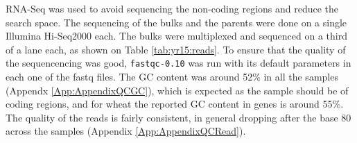 RNA-Seq was used to avoid sequencing the non-coding regions and reduce the search space.  
The sequencing of the bulks and the parents were done on a single Illumina Hi-Seq2000 each.
The bulks were multiplexed and sequenced on a third of a lane each, as shown on Table \ref{tab:yr15:reads}. 
To ensure that the quality of the sequencencing was good, \verb|fastqc-0.10| \citep{fastqc}  was run with its default parameters in each one of the fastq files.  
The GC content was around 52\% in all the samples (Appendx \ref{App:AppendixQCGC}), which is expected as the sample should be of coding regions, and for wheat the reported GC content in genes is around 55\%.  
The quality of the reads is fairly consistent, in general dropping after the base 80 across the samples (Appendix \ref{App:AppendixQCRead}). 





